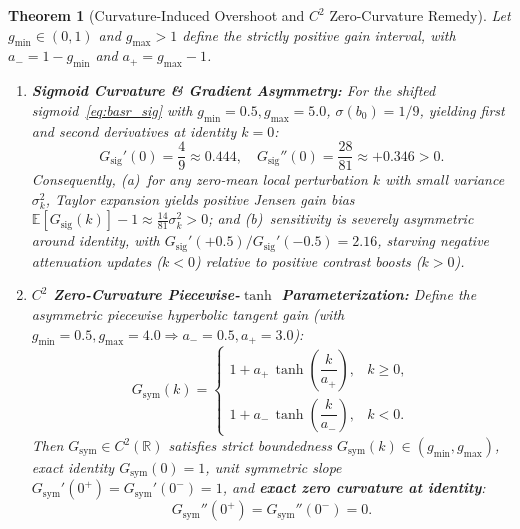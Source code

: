 \documentclass[journal,twoside]{IEEEtran}
\newtheorem{theorem}{Theorem}
\begin{document}
\begin{theorem}[Curvature-Induced Overshoot and $C^2$ Zero-Curvature Remedy]
\label{thm:basr}
Let $g_{\min}\in(0,1)$ and $g_{\max}>1$ define the strictly positive gain interval, with $a_- = 1 - g_{\min}$ and $a_+ = g_{\max} - 1$.
\begin{enumerate}
    \item \textbf{Sigmoid Curvature \& Gradient Asymmetry:} For the shifted sigmoid~\eqref{eq:basr_sig} with $g_{\min}=0.5, g_{\max}=5.0$, $\sigma(b_0)=1/9$, yielding first and second derivatives at identity $k=0$:
    \begin{equation}
    G_{\mathrm{sig}}'(0) = \frac{4}{9} \approx 0.444,\quad G_{\mathrm{sig}}''(0) = \frac{28}{81} \approx +0.346 > 0.
    \label{eq:sig_curv}
    \end{equation}
    Consequently, (a)~for any zero-mean local perturbation $k$ with small variance $\sigma_k^2$, Taylor expansion yields positive Jensen gain bias $\mathbb{E}[G_{\mathrm{sig}}(k)] - 1 \approx \frac{14}{81}\sigma_k^2 > 0$; and (b)~sensitivity is severely asymmetric around identity, with $G_{\mathrm{sig}}'(+0.5)/G_{\mathrm{sig}}'(-0.5) = 2.16$, starving negative attenuation updates ($k<0$) relative to positive contrast boosts ($k>0$).
    \item \textbf{$C^2$ Zero-Curvature Piecewise-$\tanh$ Parameterization:} Define the asymmetric piecewise hyperbolic tangent gain (with $g_{\min}=0.5, g_{\max}=4.0 \Rightarrow a_-=0.5, a_+=3.0$):
    \begin{equation}
    G_{\mathrm{sym}}(k) =
    \begin{cases}
    1 + a_+\,\tanh\!\left(\dfrac{k}{a_+}\right), & k \ge 0, \\[8pt]
    1 + a_-\,\tanh\!\left(\dfrac{k}{a_-}\right), & k < 0.
    \end{cases}
    \label{eq:basr_sym}
    \end{equation}
    Then $G_{\mathrm{sym}} \in C^2(\mathbb{R})$ satisfies strict boundedness $G_{\mathrm{sym}}(k)\in(g_{\min}, g_{\max})$, exact identity $G_{\mathrm{sym}}(0)=1$, unit symmetric slope $G_{\mathrm{sym}}'(0^+)=G_{\mathrm{sym}}'(0^-)=1$, and \textbf{exact zero curvature at identity}:
    \begin{equation}
    G_{\mathrm{sym}}''(0^+) = G_{\mathrm{sym}}''(0^-) = 0.
    \label{eq:sym_zero_curv}
    \end{equation}
\end{enumerate}
\end{theorem}
\end{document}
